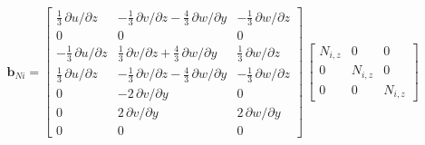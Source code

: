 \begin{equation}
\mathbf{b}_{Ni} = \begin{bmatrix}
\tfrac{1}{3} \, \partial u / \partial z &  - \tfrac{1}{3} \, \partial v / \partial z - \tfrac{4}{3} \, \partial w / \partial y & - \tfrac{1}{3} \, \partial w / \partial z   \\
0 &  0 & 0  \\
- \tfrac{1}{3} \, \partial u / \partial z &  \tfrac{1}{3} \, \partial v / \partial z + \tfrac{4}{3} \, \partial w / \partial y & \tfrac{1}{3} \, \partial w / \partial z \\
\tfrac{1}{3} \, \partial u / \partial z &  - \tfrac{1}{3} \, \partial v / \partial z - \tfrac{4}{3} \, \partial w / \partial y & - \tfrac{1}{3} \, \partial w / \partial z \\
0 &  -2 \, \partial v / \partial y & 0  \\
0 &  2 \, \partial v / \partial y & 2 \, \partial w / \partial y  \\
0 &  0 &  0 \end{bmatrix} \, \begin{bmatrix}
N_{i,z} &  0 & 0  \\
0 & N_{i,z} & 0  \\
0 & 0 & N_{i,z}  \end{bmatrix} 
\end{equation}

